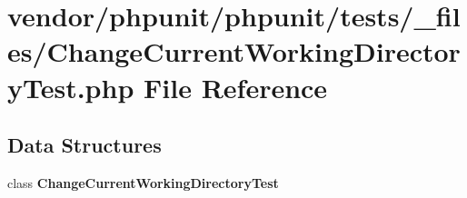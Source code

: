 \section{vendor/phpunit/phpunit/tests/\+\_\+files/\+Change\+Current\+Working\+Directory\+Test.php File Reference}
\label{_change_current_working_directory_test_8php}
\subsection*{Data Structures}
\begin{DoxyCompactItemize}
\item 
class {\bf Change\+Current\+Working\+Directory\+Test}
\end{DoxyCompactItemize}
